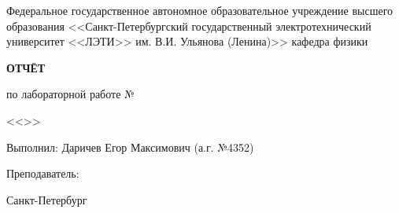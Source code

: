 \begin{titlepage}
    {\Large
    \begin{center}
        Федеральное государственное автономное образовательное учреждение высшего
        образования <<Санкт-Петербургский государственный электротехнический
        университет <<ЛЭТИ>> им. В.И. Ульянова (Ленина)>>
        кафедра физики

        \bfseries
        \vspace{0.23\textheight}
        ОТЧЁТ\par
        по лабораторной работе №\labnum\par
        <<\labtitle>>\par
        \vspace{0.15\textheight}
    \end{center}
    
    Выполнил: Даричев Егор Максимович (а.г. №4352) \par
    Преподаватель: \tteacher
    \vspace{0.2\textheight}
    
    \begin{center}
        Санкт-Петербург\par
        \yyear
    \end{center}
    }
\end{titlepage}